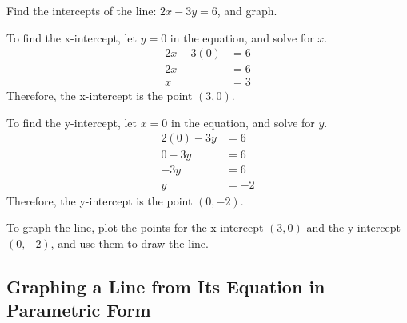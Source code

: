 \begin{example}
Find the intercepts of the line: $2x - 3y = 6$, and graph.
\end{example}

\begin{solution} To find the x-intercept, let $y = 0$ in the equation, and solve for $x$.
\begin{align*}
2x - 3(0) &= 6 \\
2x &= 6 \\
x &= 3
\end{align*}
Therefore, the x-intercept is the point $(3, 0)$.

To find the y-intercept, let $x = 0$ in the equation, and solve for $y$.
\begin{align*}
2(0) - 3y &= 6 \\
0 - 3y &= 6 \\
-3y &= 6 \\
y &= -2
\end{align*}
Therefore, the y-intercept is the point $(0, -2)$.

To graph the line, plot the points for the x-intercept $(3, 0)$ and the y-intercept $(0, -2)$, and use them to draw the line.

\begin{center}
\end{center}


\end{solution}
\subsection{Graphing a Line from Its Equation in Parametric Form}

